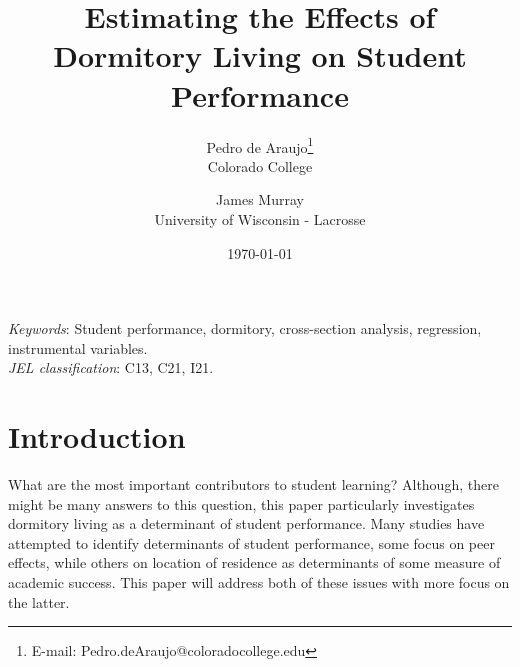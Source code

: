 \documentclass[12pt]{article}
\begin{document}
\begin{titlepage}
\begin{singlespace}
\title{Estimating the Effects of Dormitory Living on Student Performance}
\date{\today}
\author{
Pedro de Araujo\thanks{E-mail: Pedro.deAraujo@coloradocollege.edu} \\
Colorado College
\and
James Murray \\
University of Wisconsin - Lacrosse
}

\maketitle

\thispagestyle{empty}

 \newline

\noindent \textit{Keywords}: Student performance, dormitory, cross-section analysis, regression, instrumental variables. \\
\noindent \textit{JEL classification}: C13, C21, I21.
\end{singlespace}
\end{titlepage}

\section{Introduction}

What are the most important contributors to student learning? Although, there might be many answers to this question, this paper particularly investigates dormitory living as a determinant of student performance.  Many studies have attempted to identify determinants of student performance, some focus on peer effects, while others on location of residence as determinants of some measure of academic success. This paper will address both of these issues with more focus on the latter.
\end{document}
